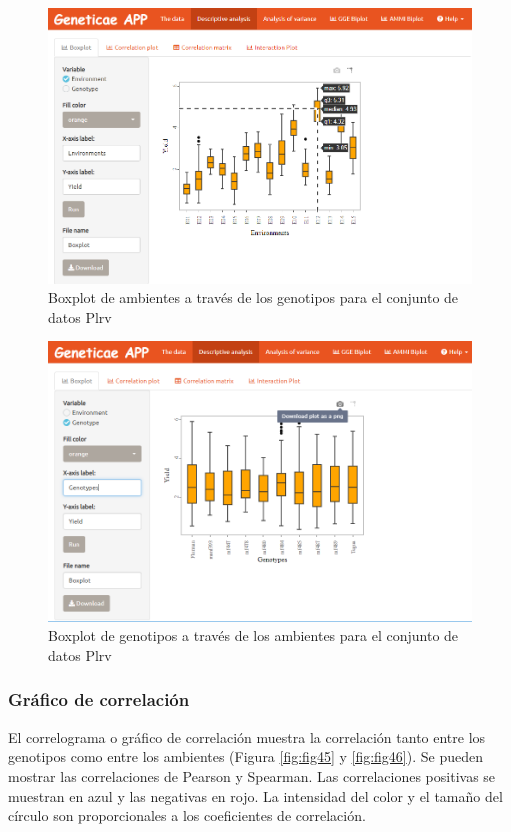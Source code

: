 \begin{figure}[H]
	\begin{center}
		\includegraphics[width=16cm]{./Graficos/Boxplot_environment.png}
	\end{center}
	\caption{Boxplot de ambientes a través de los genotipos para el conjunto de datos Plrv}
	\label{fig:fig43}
\end{figure}


\begin{figure}[H]
	\begin{center}
		\includegraphics[width=16cm]{./Graficos/Boxplot_genotypes.png}
	\end{center}
	\caption{Boxplot de genotipos a través de los ambientes para el conjunto de datos Plrv}
	\label{fig:fig44}
\end{figure}

\subsubsection{Gráfico de correlación}
El correlograma o gráfico de correlación muestra la correlación tanto entre los genotipos como entre los ambientes (Figura \ref{fig:fig45} y \ref{fig:fig46}). Se pueden mostrar las correlaciones de Pearson y Spearman. Las correlaciones positivas se muestran en azul y las negativas en rojo. La intensidad del color y el tamaño del círculo son proporcionales a los coeficientes de correlación. 


